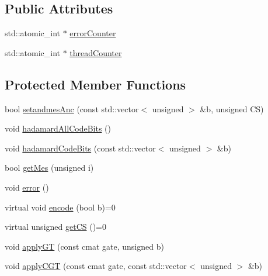 \subsection*{Public Attributes}
\begin{DoxyCompactItemize}
\item 
std\+::atomic\+\_\+int $\ast$ \hyperlink{class_code_ab4f00a8ff5a23276a54c7b163b34219a}{error\+Counter}
\item 
std\+::atomic\+\_\+int $\ast$ \hyperlink{class_code_a3c6a29ddf07c39bda3e78d05cada42b5}{thread\+Counter}
\end{DoxyCompactItemize}
\subsection*{Protected Member Functions}
\begin{DoxyCompactItemize}
\item 
bool \hyperlink{class_code_a30cba39121d9b63fd3344f639fe42487}{setandmes\+Anc} (const std\+::vector$<$ unsigned $>$ \&b, unsigned CS)
\item 
void \hyperlink{class_code_ad554df1048f44e7e02404e9670a3d8de}{hadamard\+All\+Code\+Bits} ()
\item 
void \hyperlink{class_code_ac67d0cdd389466240874cc124137b6ac}{hadamard\+Code\+Bits} (const std\+::vector$<$ unsigned $>$ \&b)
\item 
bool \hyperlink{class_code_ac1116dcd1573b570cfee1a044f4526a9}{get\+Mes} (unsigned i)
\item 
void \hyperlink{class_code_af87289ca8b76769d7a572a0d1b324155}{error} ()
\item 
virtual void \hyperlink{class_code_a5f90b0f96002c9b999d8ed7bab319906}{encode} (bool b)=0
\item 
virtual unsigned \hyperlink{class_code_a34f52b25d78aeaec3c1fd381f025ad00}{get\+CS} ()=0
\item 
void \hyperlink{class_code_a63474ffa6825d0efcfa8a40cac225d4a}{apply\+GT} (const cmat gate, unsigned b)
\item 
void \hyperlink{class_code_a3fe9fc7acd3f4c9cc80d5fd39322ca04}{apply\+C\+GT} (const cmat gate, const std\+::vector$<$ unsigned $>$ \&b)
\end{DoxyCompactItemize}
